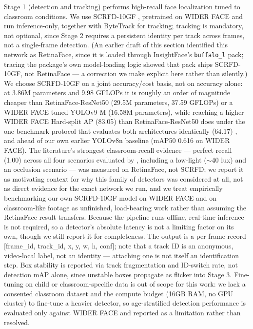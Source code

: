 \documentclass[12pt]{article}
\begin{document}
Stage 1 (detection and tracking) performs high-recall face localization tuned to classroom conditions. We use SCRFD-10GF \cite{scrfd}, pretrained on WIDER FACE \cite{widerface} and run inference-only, together with ByteTrack for tracking; tracking is mandatory, not optional, since Stage 2 requires a persistent identity per track across frames, not a single-frame detection. (An earlier draft of this section identified this network as RetinaFace, since it is loaded through InsightFace's \texttt{buffalo\_l} pack; tracing the package's own model-loading logic showed that pack ships SCRFD-10GF, not RetinaFace — a correction we make explicit here rather than silently.) We choose SCRFD-10GF on a joint accuracy/cost basis, not on accuracy alone: at 3.86M parameters and 9.98 GFLOPs it is roughly an order of magnitude cheaper than RetinaFace-ResNet50 (29.5M parameters, 37.59 GFLOPs) or a WIDER-FACE-tuned YOLOv9-M (16.58M parameters), while reaching a higher WIDER FACE Hard-split AP (83.05) than RetinaFace-ResNet50 does under the one benchmark protocol that evaluates both architectures identically (64.17) \cite{scrfd}, and ahead of our own earlier YOLOv8n baseline (mAP50 0.616 on WIDER FACE). The literature's strongest classroom-recall evidence — perfect recall (1.00) across all four scenarios evaluated by \cite{gf-ananda}, including a low-light ($\sim$40 lux) and an occlusion scenario — was measured on RetinaFace, not SCRFD; we report it as motivating context for why this family of detectors was considered at all, not as direct evidence for the exact network we run, and we treat empirically benchmarking our own SCRFD-10GF model on WIDER FACE and on classroom-like footage as unfinished, load-bearing work rather than assuming the RetinaFace result transfers. Because the pipeline runs offline, real-time inference is not required, so a detector's absolute latency is not a limiting factor on its own, though we still report it for completeness. The output is a per-frame record [frame\_id, track\_id, x, y, w, h, conf]; note that a track ID is an anonymous, video-local label, not an identity — attaching one is not itself an identification step. Box stability is reported via track fragmentation and ID-switch rate, not detection mAP alone, since unstable boxes propagate as flicker into Stage 3. Fine-tuning on child or classroom-specific data is out of scope for this work: we lack a consented classroom dataset and the compute budget (16GB RAM, no GPU cluster) to fine-tune a heavier detector, so age-stratified detection performance is evaluated only against WIDER FACE and reported as a limitation rather than resolved.
\end{document}
